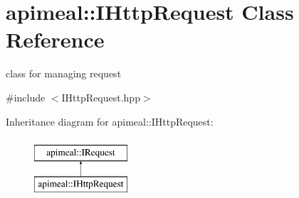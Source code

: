 \hypertarget{classapimeal_1_1IHttpRequest}{\section{apimeal\-:\-:I\-Http\-Request Class Reference}
\label{classapimeal_1_1IHttpRequest}
}


class for managing request  




{\ttfamily \#include $<$I\-Http\-Request.\-hpp$>$}

Inheritance diagram for apimeal\-:\-:I\-Http\-Request\-:\begin{figure}[H]
\begin{center}
\leavevmode
\includegraphics[height=2.000000cm]{classapimeal_1_1IHttpRequest}
\end{center}
\end{figure}
